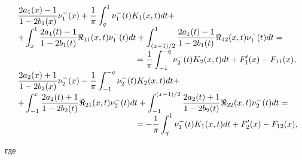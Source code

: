 \begin{equation}

\hspace{-1mm}

\begin{array}{l} 

\displaystyle

\frac{{2{a_1}(x) - 1}}{{1 - 2{b_1}(x)}} \nu _1^ - (x) + \frac{1}{\pi } \int _q^1 {\nu _1^ - (t){K_1}(x,t)dt}  + \\

\displaystyle 

+ 

\int _x^1 \frac{{2{a_1}(t) - 1}}{{1 - 2{b_1}(t)}}{\Re _{11}}(x,t)\nu _1^ - (t)dt +    

\int _{({{x + 1}})/{2}}^1 {\frac{{2{a_1}(t) - 1}}{{1 - 2{b_1}(t)}}{\Re _{12}}(x,t)\nu _1^ - (t)dt} =

\\

\displaystyle 

\hspace{5cm}

  = \frac{1}{\pi } \int _{ - 1}^{ - q} {\nu _2^ - (t){K_2}(x,t)dt}  + {F'_1}(x) - {F_{11}}(x),

  \\[2mm]

  \displaystyle

\frac{{2{a_2}(x) + 1}}{{1 - 2{b_2}(x)}}\nu _2^ - (x) - \frac{1}{\pi } \int _{ - 1}^{ - q} {\nu _2^ - (t){K_2}(x,t)dt}  + \\

\displaystyle 

+  \int _{ - 1}^x {\frac{{2{a_2}(t) + 1}}{{1 - 2{b_2}(t)}}{\Re _{21}}(x,t)\nu _2^ - (t)dt}   +  \int _{ - 1}^{({{x - 1}})/{2}} {\frac{{2{a_2}(t) + 1}}{{1 - 2{b_2}(t)}}{\Re _{22}}(x,t)\nu _2^ - (t)dt}  = \\

\displaystyle 

\hspace{5cm}

=  - \frac{1}{\pi } \int _q^1 {\nu _1^ - (t){K_1}(x,t)dt}  + {F'_2}(x) - {F_{12}}(x),

\end{array} \label{eq:37}

\hspace{-3mm}

\end{equation}

где

